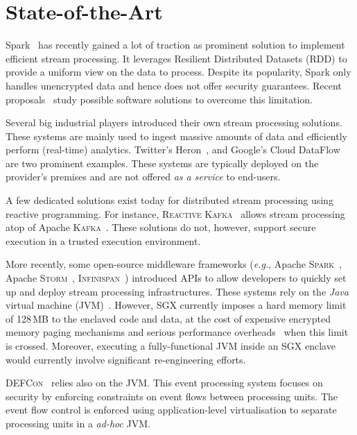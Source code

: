 
\chapter{State-of-the-Art}
\label{chap:soa}

Spark~\cite{Zaharia:2013:DSF:2517349.2522737} has recently gained a lot of traction as prominent solution to implement efficient stream processing.
It leverages Resilient Distributed Datasets (RDD) to provide a uniform view on the data to process.
Despite its popularity, Spark only handles unencrypted data and hence does not offer security guarantees.
Recent proposals~\cite{7840754} study possible software solutions to overcome this limitation.

Several big industrial players introduced their own stream processing solutions.
These systems are mainly used to ingest massive amounts of data and efficiently perform (real-time) analytics.
Twitter's Heron~\cite{Kulkarni:2015:THS:2723372.2742788}, and Google's Cloud DataFlow~\cite{Akidau:2015:DMP:2824032.2824076} are two prominent examples.
These systems are typically deployed on the provider's premises and are not offered \emph{as a service} to end-users.

A few dedicated solutions exist today for distributed stream processing using reactive programming.
For instance, \textsc{Reactive Kafka}~\cite{reactivekafka} allows stream processing atop of Apache \textsc{Kafka}~\cite{apachekafka,kreps2011kafka}.
These solutions do not, however, support secure execution in a trusted execution environment.

More recently, some open-source middleware frameworks (\textit{e.g.}, Apache \textsc{Spark}~\cite{apachesparkstreaming}, Apache \textsc{Storm}~\cite{apachestorm}, \textsc{Infinispan}~\cite{infinispan}) introduced APIs to allow developers to quickly set up and deploy stream processing infrastructures.
These systems rely on the \emph{Java} virtual machine (JVM)~\cite{lindholm2014java}.
However, SGX currently imposes a hard memory limit of 128\,MB to the enclaved code and data, at the cost of expensive encrypted memory paging mechanisms and serious performance overheads~\cite{pires_scbr:2016,brenner_securekeeper:_2016} when this limit is crossed.
Moreover, executing a fully-functional JVM inside an SGX enclave would currently involve significant re-engineering efforts.

\textsc{DEFCon}~\cite{Migliavacca:2010:DHE} relies also on the JVM.
This event processing system focuses on security by enforcing constraints on event flows between processing units.
The event flow control is enforced using application-level virtualisation to separate processing units in a \textit{ad-hoc} JVM.


